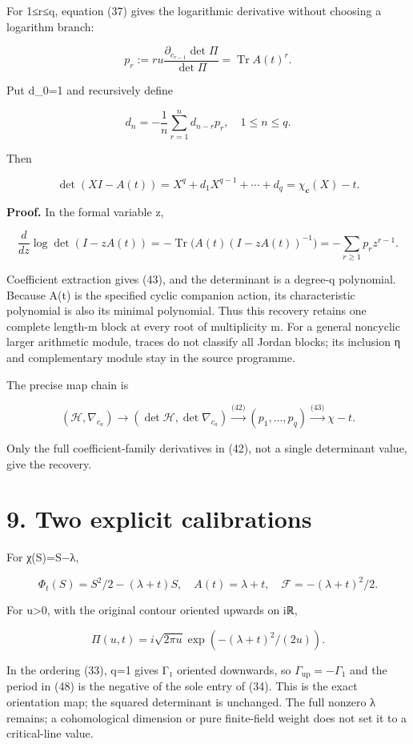 \documentclass[
  11pt,
]{article}
\begin{document}
For 1≤r≤q, equation (37) gives the logarithmic derivative without
choosing a logarithm branch:

\[
p_r:=r u\frac{\partial_{c_{r-1}}\det\Pi}{\det\Pi}
 =\operatorname{Tr}A(t)^r.
\tag{42}
\]

Put d\_0=1 and recursively define

\[
d_n=-\frac1n\sum_{r=1}^n d_{n-r}p_r,
\quad1\le n\le q.
\tag{43}
\]

Then

\[
\boxed{\det(XI-A(t))=X^q+d_1X^{q-1}+\cdots+d_q
 =\chi_{\mathbf c}(X)-t.}
\tag{44}
\]

\textbf{Proof.} In the formal variable z,

\[
\frac{d}{dz}\log\det(I-zA(t))
 =-\operatorname{Tr}\bigl(A(t)(I-zA(t))^{-1}\bigr)
 =-\sum_{r\ge1}p_rz^{r-1}.
\tag{45}
\]

Coefficient extraction gives (43), and the determinant is a degree-q
polynomial. Because A(t) is the specified cyclic companion action, its
characteristic polynomial is also its minimal polynomial. Thus this
recovery retains one complete length-m block at every root of
multiplicity m. For a general noncyclic larger arithmetic module, traces
do not classify all Jordan blocks; its inclusion η and complementary
module stay in the source programme.

The precise map chain is

\[
(\mathcal H,\nabla_{c_a})\longrightarrow
(\det\mathcal H,\det\nabla_{c_a})
\xrightarrow{\text{(42)}}(p_1,\ldots,p_q)
\xrightarrow{\text{(43)}}\chi-t.
\tag{46}
\]

Only the full coefficient-family derivatives in (42), not a single
determinant value, give the recovery.

\section{9. Two explicit calibrations}\label{two-explicit-calibrations}

For χ(S)=S−λ,

\[
\Phi_t(S)=S^2/2-(\lambda+t)S,
\quad A(t)=\lambda+t,
\quad\mathcal F=-(\lambda+t)^2/2.
\tag{47}
\]

For u\textgreater0, with the original contour oriented upwards on iℝ,

\[
\Pi(u,t)=i\sqrt{2\pi u}\exp(-(\lambda+t)^2/(2u)).
\tag{48}
\]

In the ordering (33), q=1 gives Γ₁ oriented downwards, so
\(\Gamma_{\mathrm{up}}=-\Gamma_1\) and the period in (48) is the
negative of the sole entry of (34). This is the exact orientation map;
the squared determinant is unchanged. The full nonzero λ remains; a
cohomological dimension or pure finite-field weight does not set it to a
critical-line value.
\end{document}
